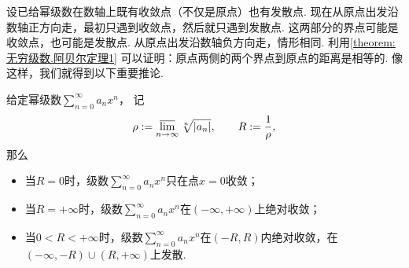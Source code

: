 设已给幂级数在数轴上既有收敛点（不仅是原点）也有发散点.
现在从原点出发沿数轴正方向走，最初只遇到收敛点，然后就只遇到发散点.
这两部分的界点可能是收敛点，也可能是发散点.
从原点出发沿数轴负方向走，情形相同.
利用\cref{theorem:无穷级数.阿贝尔定理1} 可以证明：原点两侧的两个界点到原点的距离是相等的.
像这样，我们就得到以下重要推论.
\begin{corollary}[柯西--阿达玛定理]\label{theorem:无穷级数.阿贝尔定理1推论}
给定幂级数\(\sum_{n=0}^\infty a_n x^n\)，
记\begin{equation*}
	\rho := \varlimsup_{n\to\infty} \sqrt[n]{\abs{a_n}},
	\qquad
	R := \frac1\rho,
\end{equation*}
那么\begin{itemize}
	\item 当\(R = 0\)时，级数\(\sum_{n=0}^\infty a_n x^n\)只在点\(x=0\)收敛；
	\item 当\(R = +\infty\)时，级数\(\sum_{n=0}^\infty a_n x^n\)在\((-\infty,+\infty)\)上绝对收敛；
	\item 当\(0 < R < +\infty\)时，级数\(\sum_{n=0}^\infty a_n x^n\)在\((-R,R)\)内绝对收敛，在\((-\infty,-R)\cup(R,+\infty)\)上发散.
\end{itemize}




\end{corollary}

